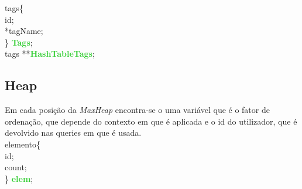 \documentclass[10pt,a4paper]{article}
\begin{document}
 \noindent {\bf{\textcolor{Emerald}{typedef struct}}} tags\{\\
	\indent {\bf{\textcolor{Emerald}{long}}} id; \\
	\indent {\bf{\textcolor{Emerald}{char}}} *tagName;\\
\} {\bf{\textcolor{LimeGreen}{Tags}}};\\

\noindent {\bf{\textcolor{Emerald}{typedef struct}}}  tags **{\bf{\textcolor{LimeGreen}{HashTableTags}}};

\subsection{Heap}

Em cada posição da \textit{MaxHeap} encontra-se o uma variável que é o fator de ordenação, que depende do contexto em que é aplicada e o id do utilizador, que é devolvido nas queries em que é usada.\\

 \noindent {\bf{\textcolor{Emerald}{typedef struct}}} elemento\{\\
    \indent {\bf{\textcolor{Emerald}{long}}} id; \\
    \indent {\bf{\textcolor{Emerald}{int}}} count;\\
\} {\bf{\textcolor{LimeGreen}{elem}}};\\
\end{document}
